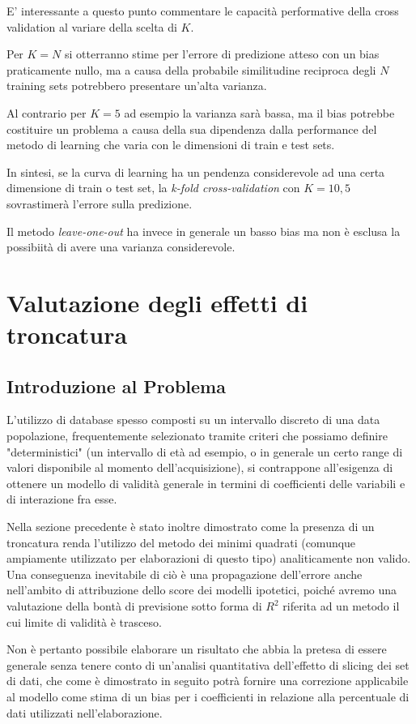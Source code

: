 \documentclass[12pt,openright,twoside,a4paper]{book}
\begin{document}
E' interessante a questo punto commentare le capacità performative della cross validation al variare della scelta di $K$.

Per $K=N$ si otterranno stime per l'errore di predizione atteso con un bias praticamente nullo, ma a causa della probabile similitudine reciproca degli $N$ training sets potrebbero presentare un'alta varianza.

Al contrario per $K=5$ ad esempio la varianza sarà bassa, ma il bias potrebbe costituire un problema a causa della sua dipendenza dalla performance del metodo di learning che varia con le dimensioni di train e test sets.

In sintesi, se la curva di learning ha un pendenza considerevole ad una certa dimensione di train o test set, la \textit{k-fold cross-validation} con $K=10,5$ sovrastimerà l'errore sulla predizione.

Il metodo \textit{leave-one-out} ha invece in generale un basso bias ma non è esclusa la possibiità di avere una varianza considerevole.

\chapter{Valutazione degli effetti di troncatura}

\section{Introduzione al Problema}
L'utilizzo di database spesso composti su un intervallo discreto di una data popolazione, frequentemente selezionato tramite criteri che possiamo definire "deterministici" (un intervallo di età ad esempio, o in generale un certo range di valori disponibile al momento dell'acquisizione), si contrappone all'esigenza di ottenere un modello di validità generale in termini di coefficienti delle variabili e di interazione fra esse.

Nella sezione precedente è stato inoltre dimostrato come la presenza di un troncatura renda l'utilizzo del metodo dei minimi quadrati (comunque ampiamente utilizzato per elaborazioni di questo tipo) analiticamente non valido.
Una conseguenza inevitabile di ciò è una propagazione dell'errore anche nell'ambito di attribuzione dello score dei modelli ipotetici, poiché avremo una valutazione della bontà di previsione sotto forma di $R^2$ riferita ad un metodo il cui limite di validità è trasceso.

Non è pertanto possibile elaborare un risultato che abbia la pretesa di essere generale senza tenere conto di un'analisi quantitativa dell'effetto di slicing dei set di dati, che come è dimostrato in seguito potrà fornire una correzione applicabile al modello come stima di un bias per i coefficienti in relazione alla percentuale di dati utilizzati nell'elaborazione.
\end{document}

